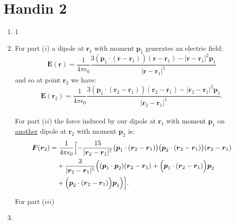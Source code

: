 \pagestyle{fancy}
\fancyhead{}

\section{Handin 2}
\begin{enumerate}
    \item 1
    
    \newpage

    \item For part ($i$)
    a dipole at $\boldsymbol{r}_1$
    with moment $\boldsymbol{p}_1$
    generates an electric field:
    $$\boldsymbol{E}(\boldsymbol{r})=\frac{1}{4\pi\epsilon_0}
    \frac{3(\boldsymbol{p}_1\cdot(\boldsymbol{r}
    -\boldsymbol{r}_1))(\boldsymbol{r}-\boldsymbol{r}_1)
    -|\boldsymbol{r}-\boldsymbol{r}_1|^2\boldsymbol{p}_1}
    {|\boldsymbol{r}-\boldsymbol{r}_1|^5}$$
    and so at point $\boldsymbol{r}_2$ we have:
    $$\boldsymbol{E}(\boldsymbol{r}_2)=\frac{1}{4\pi\epsilon_0}
    \frac{3(\boldsymbol{p}_1\cdot(\boldsymbol{r}_2
    -\boldsymbol{r}_1))(\boldsymbol{r}_2-\boldsymbol{r}_1)
    -|\boldsymbol{r}_2-\boldsymbol{r}_1|^2\boldsymbol{p}_1}
    {|\boldsymbol{r}_2-\boldsymbol{r}_1|^5}.$$ \\

    For part ($ii$) the force induced by our dipole at $\boldsymbol{r}_1$
    with moment $\boldsymbol{p}_1$ on \underline{another} dipole 
    at $\boldsymbol{r}_2$ with moment $\boldsymbol{p}_2$ is:
    \begin{align*}
        \boldsymbol{F}(\boldsymbol{r}_2)
        &=\frac{1}{4\pi\epsilon_0}
        \Bigl[-\frac{15}{|\boldsymbol{r}_2-\boldsymbol{r}_1|^7}
        \bigl(\boldsymbol{p}_1\cdot(\boldsymbol{r}_2-\boldsymbol{r}_1)\bigr)
        \bigl(\boldsymbol{p}_2\cdot(\boldsymbol{r}_2-\boldsymbol{r}_1)\bigr)
        (\boldsymbol{r}_2-\boldsymbol{r}_1) \\
        &\quad+\frac{3}{|\boldsymbol{r}_2-\boldsymbol{r}_1|^5}
        \Bigl((\boldsymbol{p}_1\cdot\boldsymbol{p}_2)
        (\boldsymbol{r}_2-\boldsymbol{r}_1)
        +\Bigl(\boldsymbol{p}_1\cdot
        (\boldsymbol{r}_2-\boldsymbol{r}_1)\Bigr)
        \boldsymbol{p}_2 \\
        &\quad+\Bigl(\boldsymbol{p}_2\cdot
        (\boldsymbol{r}_2-\boldsymbol{r}_1)\Bigr)
        \boldsymbol{p}_1
        \Bigr)\Bigr]. \\
    \end{align*}

    For part ($iii$)

    \newpage

    \item
\end{enumerate}